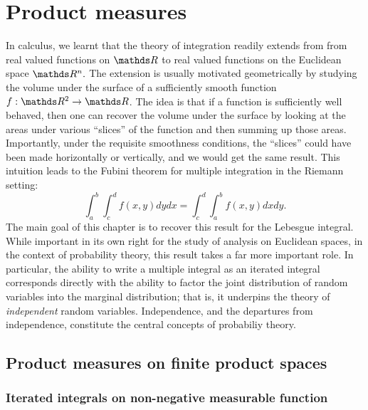 
\chapter{Product measures}

In calculus, we learnt that the theory of integration readily extends
from from real valued functions on $\R$ to real valued functions
on the Euclidean space $\R^{n}.$ The extension is usually motivated
geometrically by studying the volume under the surface of a sufficiently
smooth function $f:\R^{2}\to\R$. The idea is that if a function is
sufficiently well behaved, then one can recover the volume under the
surface by looking at the areas under various ``slices'' of the function
and then summing up those areas. Importantly, under the requisite
smoothness conditions, the ``slices'' could have been made horizontally
or vertically, and we would get the same result. This intuition leads
to the Fubini theorem for multiple integration in the Riemann setting:
\[
\int_{a}^{b}\int_{c}^{d}f(x,y)dydx=\int_{c}^{d}\int_{a}^{b}f(x,y)dxdy.
\]
The main goal of this chapter is to recover this result for the Lebesgue
integral. While important in its own right for the study of analysis
on Euclidean spaces, in the context of probability theory, this result
takes a far more important role. In particular, the ability to write
a multiple integral as an iterated integral corresponds directly with
the ability to factor the joint distribution of random variables into
the marginal distribution; that is, it underpins the theory of \emph{independent
}random variables. Independence, and the departures from independence,
constitute the central concepts of probabiliy theory.

\section{Product measures on finite product spaces}

\subsection{Iterated integrals on non-negative measurable function}

